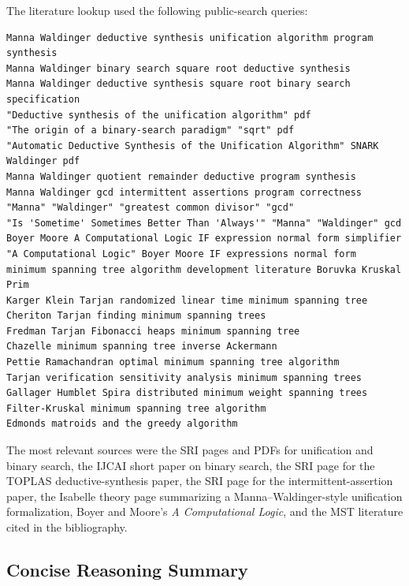 \documentclass[runningheads]{llncs}
\begin{document}
The literature lookup used the following public-search queries:
\begin{lstlisting}
Manna Waldinger deductive synthesis unification algorithm program synthesis
Manna Waldinger binary search square root deductive synthesis
Manna Waldinger deductive synthesis square root binary search specification
"Deductive synthesis of the unification algorithm" pdf
"The origin of a binary-search paradigm" "sqrt" pdf
"Automatic Deductive Synthesis of the Unification Algorithm" SNARK Waldinger pdf
Manna Waldinger quotient remainder deductive program synthesis
Manna Waldinger gcd intermittent assertions program correctness
"Manna" "Waldinger" "greatest common divisor" "gcd"
"Is 'Sometime' Sometimes Better Than 'Always'" "Manna" "Waldinger" gcd
Boyer Moore A Computational Logic IF expression normal form simplifier
"A Computational Logic" Boyer Moore IF expressions normal form
minimum spanning tree algorithm development literature Boruvka Kruskal Prim
Karger Klein Tarjan randomized linear time minimum spanning tree
Cheriton Tarjan finding minimum spanning trees
Fredman Tarjan Fibonacci heaps minimum spanning tree
Chazelle minimum spanning tree inverse Ackermann
Pettie Ramachandran optimal minimum spanning tree algorithm
Tarjan verification sensitivity analysis minimum spanning trees
Gallager Humblet Spira distributed minimum weight spanning trees
Filter-Kruskal minimum spanning tree algorithm
Edmonds matroids and the greedy algorithm
\end{lstlisting}
The most relevant sources were the SRI pages and PDFs for unification and
binary search, the IJCAI short paper on binary search, the SRI page for the
TOPLAS deductive-synthesis paper, the SRI page for the intermittent-assertion
paper, the Isabelle theory page summarizing a Manna--Waldinger-style
unification formalization, Boyer and Moore's \emph{A Computational Logic}, and
the MST literature cited in the bibliography.

\subsection{Concise Reasoning Summary}
\end{document}
